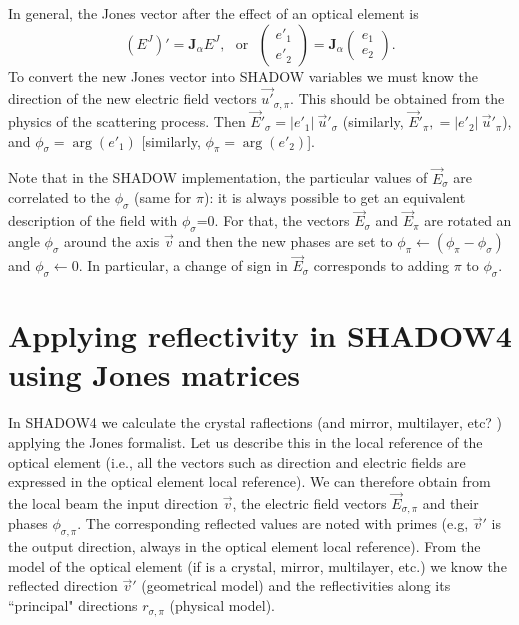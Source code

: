 \documentclass{iucr}
\begin{document}
In general, the Jones vector after the effect of an optical element is
\begin{equation}\label{eq:applyJones}
    (E^J)' = \textbf{J}_\alpha E^J, \text{~~or~~}
        \begin{pmatrix}
        e'_1 \\
        e'_2
    \end{pmatrix}
    =
    \textbf{J}_\alpha
    \begin{pmatrix}
        e_1 \\
        e_2
    \end{pmatrix}.
\end{equation}
To convert the new Jones vector into SHADOW variables we must know the direction of the new electric field vectors $\vec{u'}_{\sigma,\pi}$. This should be obtained from the physics of the scattering process. Then $\vec{E}'_\sigma=|e'_1| ~\vec{u}'_\sigma$ (similarly, $\vec{E}'_\pi,=|e'_2| ~\vec{u}'_\pi$), and $\phi_\sigma=\arg(e'_1)$ [similarly, $\phi_\pi=\arg(e'_2)$].

Note that in the SHADOW implementation, the particular values of $\vec{E}_\sigma$ are correlated to the $\phi_\sigma$ (same for $\pi$): it is always possible to get an equivalent description of the field with $\phi_\sigma$=0. For that, the vectors $\vec{E}_\sigma$ and $\vec{E}_\pi$ are rotated an angle $\phi_\sigma$ around the axis $\vec{v}$ and then the new phases are set to $\phi_\pi \xleftarrow{}(\phi_\pi-\phi_\sigma)$ and $\phi_\sigma\xleftarrow{}0$. In particular, a change of sign in $\vec{E}_\sigma$ corresponds to adding $\pi$ to $\phi_\sigma$.

\section{Applying reflectivity in SHADOW4 using Jones matrices }\label{sec:JonesInS4}

In SHADOW4 we calculate the crystal raflections (and mirror, multilayer, etc? ) applying the Jones formalist. Let us describe this in the local reference of the optical element (i.e., all the vectors such as direction and electric fields are expressed in the optical element local reference).
We can therefore obtain from the local beam the input direction $\vec{v}$, the electric field vectors $\vec{E}_{\sigma,\pi}$ and their phases $\phi_{\sigma,\pi}$.
The corresponding reflected values are noted with primes (e.g, $\vec{v}'$ is the output direction, always in the optical element local reference).
From the model of the optical element (if is a crystal, mirror, multilayer, etc.) we know the reflected direction $\vec{v}'$ (geometrical model) and the reflectivities along its ``principal" directions $r_{\sigma,\pi}$ (physical model).
\end{document}
